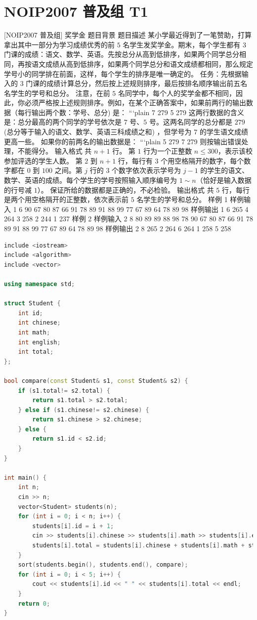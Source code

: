 \documentclass[12pt,twiside,a4paper]{ctexbook}
\numberwithin{chapter}{part}
\begin{document}
\section{NOIP2007 普及组 T1}
[NOIP2007 普及组] 奖学金
 题目背景
 题目描述
某小学最近得到了一笔赞助，打算拿出其中一部分为学习成绩优秀的前 $5$ 名学生发奖学金。期末，每个学生都有 $3$ 门课的成绩：语文、数学、英语。先按总分从高到低排序，如果两个同学总分相同，再按语文成绩从高到低排序，如果两个同学总分和语文成绩都相同，那么规定学号小的同学排在前面，这样，每个学生的排序是唯一确定的。
任务：先根据输入的 $3$ 门课的成绩计算总分，然后按上述规则排序，最后按排名顺序输出前五名名学生的学号和总分。
注意，在前 $5$ 名同学中，每个人的奖学金都不相同，因此，你必须严格按上述规则排序。例如，在某个正确答案中，如果前两行的输出数据（每行输出两个数：学号、总分) 是：
```plain
7 279  
5 279
这两行数据的含义是：总分最高的两个同学的学号依次是 $7$ 号、$5$ 号。这两名同学的总分都是 $279$ (总分等于输入的语文、数学、英语三科成绩之和) ，但学号为 $7$ 的学生语文成绩更高一些。
如果你的前两名的输出数据是：
```plain
5 279  
7 279
则按输出错误处理，不能得分。
 输入格式
共 $n+1$ 行。
第 $1$ 行为一个正整数 $n \le 300$，表示该校参加评选的学生人数。
第 $2$ 到 $n+1$ 行，每行有 $3$ 个用空格隔开的数字，每个数字都在 $0$ 到 $100$ 之间。第 $j$ 行的 $3$ 个数字依次表示学号为 $j-1$ 的学生的语文、数学、英语的成绩。每个学生的学号按照输入顺序编号为 $1\sim n$（恰好是输入数据的行号减 $1$）。
保证所给的数据都是正确的，不必检验。
 输出格式
共 $5$ 行，每行是两个用空格隔开的正整数，依次表示前 $5$ 名学生的学号和总分。
 样例 1
 样例输入 1
6
90 67 80
87 66 91
78 89 91
88 99 77
67 89 64
78 89 98
 样例输出 1
6 265
4 264
3 258
2 244
1 237
 样例 2
 样例输入 2
8
80 89 89
88 98 78
90 67 80
87 66 91
78 89 91
88 99 77
67 89 64
78 89 98
 样例输出 2
8 265
2 264
6 264
1 258
5 258
\begin{lstlisting}[language=c++,breaklines=true]
include <iostream>
include <algorithm>
include <vector>

using namespace std;

struct Student {
    int id;
    int chinese;
    int math;
    int english;
    int total;
};

bool compare(const Student& s1, const Student& s2) {
    if (s1.total!= s2.total) {
        return s1.total > s2.total;
    } else if (s1.chinese!= s2.chinese) {
        return s1.chinese > s2.chinese;
    } else {
        return s1.id < s2.id;
    }
}

int main() {
    int n;
    cin >> n;
    vector<Student> students(n);
    for (int i = 0; i < n; i++) {
        students[i].id = i + 1;
        cin >> students[i].chinese >> students[i].math >> students[i].english;
        students[i].total = students[i].chinese + students[i].math + students[i].english;
    }
    sort(students.begin(), students.end(), compare);
    for (int i = 0; i < 5; i++) {
        cout << students[i].id << " " << students[i].total << endl;
    }
    return 0;
}
\end{lstlisting}
\end{document}
